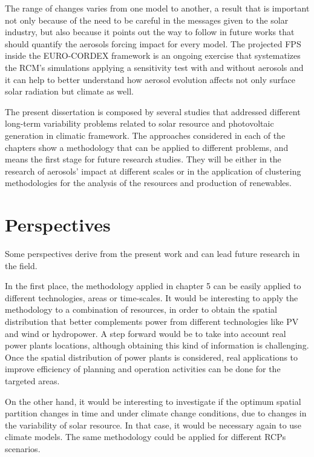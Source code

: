   The range of changes varies from one model to another, a result that is important not only because of the need to be careful in the messages given to the solar industry, but also because it points out the way to follow in future works that should quantify the aerosols forcing impact for every model. The projected FPS inside the EURO-CORDEX framework is an ongoing exercise that systematizes the RCM's simulations applying a sensitivity test with and without aerosols and it can help to better understand how aerosol evolution affects not only surface solar radiation but climate as well.

  The present dissertation is composed by several studies that addressed different long-term variability problems related to solar resource and photovoltaic generation in climatic framework. The approaches considered in each of the chapters show a methodology that can be applied to different problems, and means the first stage for future research studies. They will be either in the research of aerosols' impact at different scales or in the application of clustering methodologies for the analysis of the resources and production of renewables.
  
 \chapter{Perspectives\label{perspectives}}

Some perspectives derive from the present work and can lead future research in the field.

In the first place, the methodology applied in chapter 5 can be easily applied to different technologies, areas or time-scales. It would be interesting to apply the methodology to a combination of resources, in order to obtain the spatial distribution that better complements power from different technologies like PV and wind or hydropower. A step forward would be to take into account real power plants locations, although obtaining this kind of information is challenging. Once the spatial distribution of power plants is considered, real applications to improve efficiency of planning and operation activities can be done for the targeted areas.

On the other hand, it would be interesting to investigate if the optimum spatial partition changes in time and under climate change conditions, due to changes in the variability of solar resource. In that case, it would be necessary again to use climate models. The same methodology could be applied for different RCPs scenarios. 

